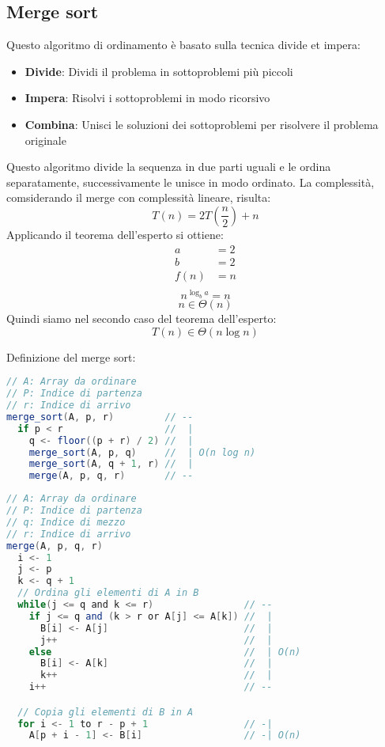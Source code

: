 \documentclass[a4paper]{article}
\begin{document}
\subsection{Merge sort}
Questo algoritmo di ordinamento è basato sulla tecnica divide et impera:
\begin{itemize}
  \item \textbf{Divide}: Dividi il problema in sottoproblemi più piccoli
  \item \textbf{Impera}: Risolvi i sottoproblemi in modo ricorsivo
  \item \textbf{Combina}: Unisci le soluzioni dei sottoproblemi per risolvere il problema
    originale
\end{itemize}
Questo algoritmo divide la sequenza in due parti uguali e le ordina separatamente, successivamente
le unisce in modo ordinato. La complessità, comsiderando il merge con complessità lineare,
risulta:
\[
  T(n) = 2T\left(\frac{n}{2}\right) + n
\] 
Applicando il teorema dell'esperto si ottiene:
\[
\begin{aligned}
  a & = 2\\
  b & = 2\\
  f(n) & = n\\
\end{aligned}
\] 
\[
  n^{\log_b a} = n
\] 
\[
  n \in \Theta(n)
\] 
Quindi siamo nel secondo caso del teorema dell'esperto:
\[
  T(n) \in \Theta(n \log n)
\]

\vspace{1em}
\noindent
Definizione del merge sort:
\begin{lstlisting}[language=Scala]
// A: Array da ordinare
// P: Indice di partenza
// r: Indice di arrivo
merge_sort(A, p, r)         // --
  if p < r                  //  |
    q <- floor((p + r) / 2) //  | 
    merge_sort(A, p, q)     //  | O(n log n)
    merge_sort(A, q + 1, r) //  |
    merge(A, p, q, r)       // --
\end{lstlisting}
\begin{lstlisting}[language=Scala]
// A: Array da ordinare
// P: Indice di partenza
// q: Indice di mezzo
// r: Indice di arrivo
merge(A, p, q, r)
  i <- 1
  j <- p
  k <- q + 1
  // Ordina gli elementi di A in B
  while(j <= q and k <= r)                // --
    if j <= q and (k > r or A[j] <= A[k]) //  |
      B[i] <- A[j]                        //  |
      j++                                 //  |
    else                                  //  | O(n)
      B[i] <- A[k]                        //  |
      k++                                 //  |
    i++                                   // --

  // Copia gli elementi di B in A
  for i <- 1 to r - p + 1                 // -|
    A[p + i - 1] <- B[i]                  // -| O(n)
\end{lstlisting}
\end{document}
